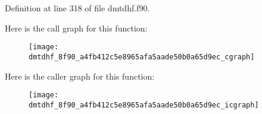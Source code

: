 Definition at line 318 of file dmtdhf.f90.



Here is the call graph for this function:\nopagebreak
\begin{figure}[H]
\begin{center}
\leavevmode
\texttt{[image: dmtdhf\_8f90\_a4fb412c5e8965afa5aade50b0a65d9ec\_cgraph]}
\end{center}
\end{figure}




Here is the caller graph for this function:
\nopagebreak
\begin{figure}[H]
\begin{center}
\leavevmode
\texttt{[image: dmtdhf\_8f90\_a4fb412c5e8965afa5aade50b0a65d9ec\_icgraph]}
\end{center}
\end{figure}


